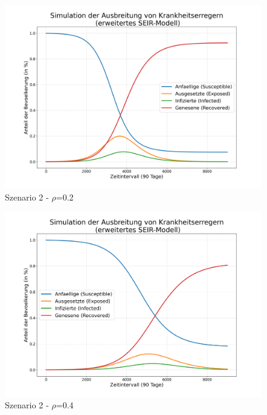 \documentclass[12pt]{article}
\begin{document}
\begin{figure}[H]
\centering
\includegraphics[scale=0.4]{Szenario_2_rho_0.2}
\caption{Szenario 2 - $\rho$=0.2}
\label{fig:szenario_2_0.2}
\end{figure}

\begin{figure}[H]
\centering
\includegraphics[scale=0.4]{Szenario_2_rho_0.4}
\caption{Szenario 2 - $\rho$=0.4}
\label{fig:szenario_2_0.4}
\end{figure}
\end{document}
